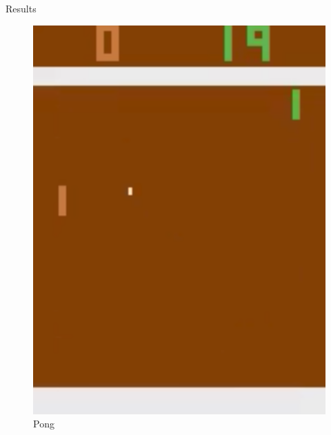 \documentclass{beamer}
\begin{document}
\begin{frame}{Results}
\begin{minipage}[t]{\textwidth}
\begin{minipage}{0.3\textwidth}
\begin{figure}
    \includegraphics[height=0.35\textheight]{img/Pong}
    \caption*{Pong}
    \end{figure}
    \end{minipage}
    \hfill
    \begin{minipage}{0.3\textwidth}
    \begin{figure}

\end{figure}
\end{minipage}
\end{minipage}
\end{frame}
\end{document}
